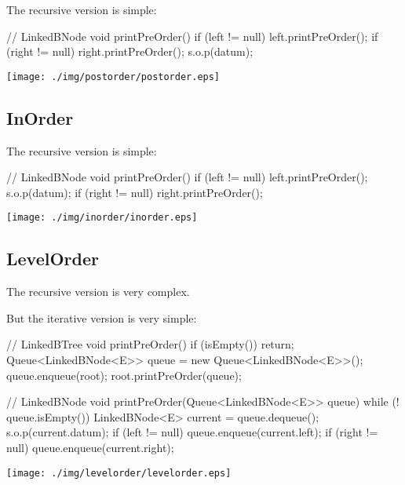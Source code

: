 \documentclass[a4paper, 9pt]{extarticle}
\begin{document}
The recursive version is simple:

\begin{multicols}{2}
\begin{blackboard}
// LinkedBNode
void printPreOrder() {
  if (left != null) {
    left.printPreOrder();
  }
  if (right != null) {
    right.printPreOrder();
  }
  s.o.p(datum);
}
\end{blackboard}
\columnbreak
\texttt{[image: ./img/postorder/postorder.eps]}
\end{multicols}

\subsection{InOrder}

The recursive version is simple:

\begin{multicols}{2}
\begin{blackboard}
// LinkedBNode
void printPreOrder() {
  if (left != null) {
    left.printPreOrder();
  }
  s.o.p(datum);
  if (right != null) {
    right.printPreOrder();
  }
}
\end{blackboard}
\columnbreak
\texttt{[image: ./img/inorder/inorder.eps]}
\end{multicols}

\newpage
\subsection{LevelOrder}

The recursive version is very complex.

But the iterative version is very simple:

\begin{multicols}{2}
\begin{blackboard}
// LinkedBTree
void printPreOrder() {
  if (isEmpty()) {
    return;
  }
  Queue<LinkedBNode<E>> queue =
    new Queue<LinkedBNode<E>>();
  queue.enqueue(root);
  root.printPreOrder(queue);
}

// LinkedBNode
void printPreOrder(Queue<LinkedBNode<E>> queue) {
  while (! queue.isEmpty()) {
    LinkedBNode<E> current = queue.dequeue();
    s.o.p(current.datum);
    if (left != null) {
      queue.enqueue(current.left);
    }
    if (right != null) {
      queue.enqueue(current.right);
    }
  }
}
\end{blackboard}
\columnbreak
\texttt{[image: ./img/levelorder/levelorder.eps]}
\end{multicols}
\end{document}
